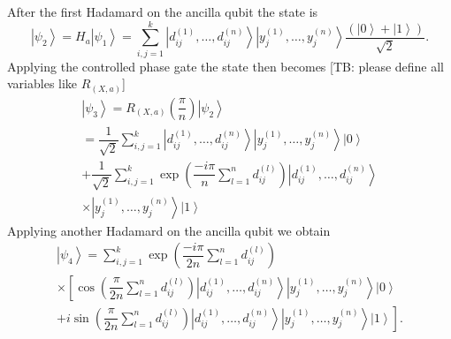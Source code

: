 \documentclass[pra,showkeys,twocolumn,showpacs]{revtex4-1}
\begin{document}
After the first Hadamard on the ancilla qubit the state is
%
\begin{equation}
    \left| \psi_2 \right\rangle = H_a\left| \psi_1 \right\rangle = 
    \sum\limits_{i, j=1}^{k} 
    \left| d^{(1)}_{ij}, \dots, d^{(n)}_{ij} \right\rangle 
    \left| y^{(1)}_j, \dots, y^{(n)}_j \right\rangle
    \dfrac{(\left| 0 \right\rangle + \left| 1 \right\rangle)}{\sqrt{2}}  .
\end{equation}
%
Applying the controlled phase gate the state then becomes [TB: please define all variables like $ R_{(X,a)} $]
%
\begin{multline}
    \left| \psi_3 \right\rangle = R_{(X,a)}\left(\dfrac{\pi}{n}\right)\left| \psi_2 \right\rangle
    \\ = \dfrac{1}{\sqrt{2}}
				\sum\limits_{i, j=1}^{k} 
				\left| d^{(1)}_{ij}, \dots, d^{(n)}_{ij} \right\rangle 
        \left| y^{(1)}_j, \dots, y^{(n)}_j \right\rangle 
        \left| 0 \right\rangle
        \\ + \dfrac{1}{\sqrt{2}}
				\sum\limits_{i, j=1}^{k}
        \exp\left(\dfrac{-i \pi}{n}\sum\limits_{l=1}^n d^{(l)}_{ij} \right)
        \left| d^{(1)}_{ij}, \dots, d^{(n)}_{ij} \right\rangle 
\\ \times        \left| y^{(1)}_j, \dots, y^{(n)}_j \right\rangle 
        \left| 1 \right\rangle
\end{multline}
%
%
%
Applying another Hadamard on the ancilla qubit we obtain
%
\begin{multline}
    \left| \psi_4 \right\rangle = 
    \sum\limits_{i, j=1}^{k} 
    \exp \left(\dfrac{-i \pi}{2n}\sum\limits_{l=1}^n d^{(l)}_{ij} \right)
		\\ \times
        \left[ \cos\left(\dfrac{\pi}{2n}\sum\limits_{l=1}^n d^{(l)}_{ij} \right)
        \left| d^{(1)}_{ij}, \dots, d^{(n)}_{ij} \right\rangle 
        \left| y^{(1)}_j, \dots, y^{(n)}_j \right\rangle 
        \left| 0 \right\rangle\right.
        \\+ 
        \left. i \sin\left(\dfrac{\pi}{2n}\sum\limits_{l=1}^n d^{(l)}_{ij} \right)
        \left| d^{(1)}_{ij}, \dots, d^{(n)}_{ij} \right\rangle 
        \left| y^{(1)}_j, \dots, y^{(n)}_j \right\rangle 
        \left| 1 \right\rangle\right] .
\end{multline}
\end{document}
